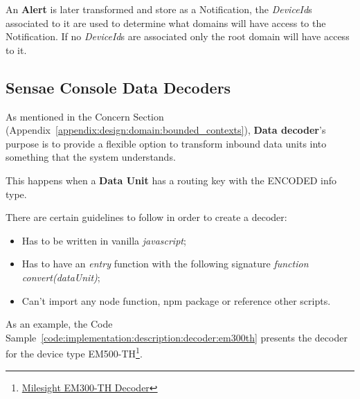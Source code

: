 An \textbf{Alert} is later transformed and store as a Notification, the \textit{DeviceId}s associated to it are used to determine what domains will have access to the Notification. If no \textit{DeviceId}s are associated only the root domain will have access to it.

\subsection{Sensae Console Data Decoders}
\label{subsec:implementation:description:decoder}

As mentioned in the  Concern Section  (Appendix~\ref{appendix:design:domain:bounded_contexts}), \textbf{Data decoder}'s purpose is to provide a flexible option to transform inbound data units into something that the system understands.

This happens when a \textbf{Data Unit} has a routing key with the ENCODED info type.

There are certain guidelines to follow in order to create a decoder:

\begin{itemize}
    \item Has to be written in vanilla \textit{javascript};
    \item Has to have an \textit{entry} function with the following signature \textit{function convert(dataUnit)};
    \item Can't import any node function, npm package or reference other scripts.
\end{itemize}

As an example, the Code Sample~\ref{code:implementation:description:decoder:em300th} presents the decoder for the device type EM500-TH\footnote{\href {https://www.milesight-iot.com/lorawan/sensor/em300-th}{Milesight EM300-TH Decoder}}.

